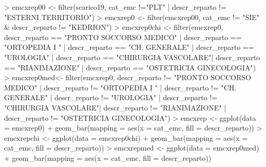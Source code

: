 \documentclass{article}
\begin{document}
\begin{Schunk}
\begin{Sinput}
> emcxrep00 <- filter(scarico19, cat_emc !="PLT" | descr_reparto != "ESTERNI TERRITORIO")
> emcxrep0 <- filter(emcxrep00, cat_emc != "SIE" & descr_reparto != "KEDRION")
> emcxrep0chi <- filter(emcxrep0, descr_reparto == "PRONTO SOCCORSO MEDICO" | descr_reparto == "ORTOPEDIA I " | descr_reparto == "CH. GENERALE"   | descr_reparto == "UROLOGIA"  | descr_reparto == "CHIRURGIA VASCOLARE"| descr_reparto == "RIANIMAZIONE" | descr_reparto == "OSTETRICIA GINECOLOGIA")
> emcxrep0med<- filter(emcxrep0, descr_reparto != "PRONTO SOCCORSO MEDICO" | descr_reparto != "ORTOPEDIA I " | descr_reparto != "CH. GENERALE"   | descr_reparto != "UROLOGIA"  | descr_reparto != "CHIRURGIA VASCOLARE"| descr_reparto != "RIANIMAZIONE" | descr_reparto != "OSTETRICIA GINECOLOGIA")
> emcxrep <- ggplot(data = emcxrep0) + geom_bar(mapping = aes(x = cat_emc, fill = descr_reparto))
> emcxrepchi <- ggplot(data = emcxrep0chi) + geom_bar(mapping = aes(x = cat_emc, fill = descr_reparto))
> emcxrepmed <- ggplot(data = emcxrep0med) + geom_bar(mapping = aes(x = cat_emc, fill = descr_reparto))
\end{Sinput}
\end{Schunk}
\end{document}
